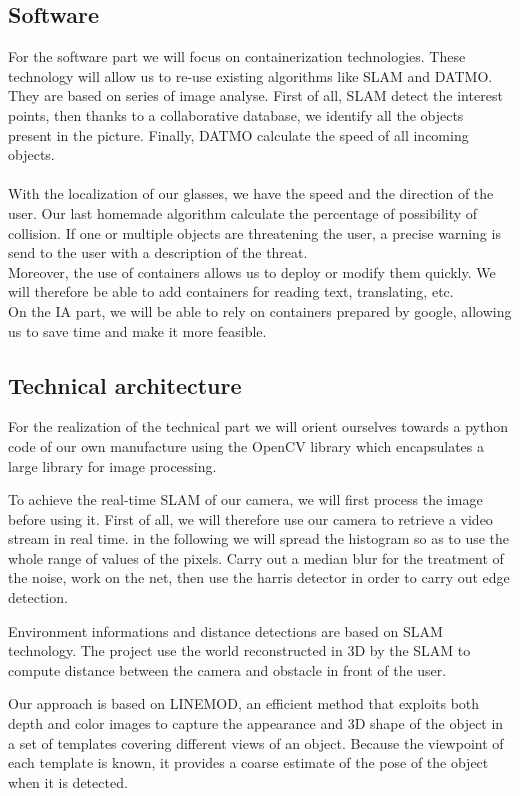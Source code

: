\documentclass[conference,compsoc]{IEEEtran}
\begin{document}
\subsection{Software}
For the software part we will focus on containerization technologies. These technology will allow us to re-use existing algorithms like SLAM and DATMO. They are based on series of image analyse. First of all, SLAM detect the interest points, then thanks to a collaborative database, we identify all the objects present in the picture. Finally, DATMO calculate the speed of all incoming objects.
\\
\\
With the localization of our glasses, we have the speed and the direction of the user. Our last homemade algorithm calculate the percentage of possibility of collision. If one or multiple objects are threatening the user, a precise warning is send to the user with a description of the threat.  
\\
Moreover, the use of containers allows us to deploy or modify them quickly.
We will therefore be able to add containers for reading text, translating, etc.
\\
On the IA part, we will be able to rely on containers prepared by google, allowing us to save time and make it more feasible.

\subsection{Technical architecture}
For the realization of the technical part we will orient ourselves towards a python code of our own manufacture using the OpenCV library which encapsulates a large library for image processing.

To achieve the real-time SLAM of our camera, we will first process the image before using it.
First of all, we will therefore use our camera to retrieve a video stream in real time. in the following we will spread the histogram so as to use the whole range of values of the pixels. Carry out a median blur for the treatment of the noise, work on the net, then use the harris detector in order to carry out edge detection.

Environment informations and distance detections are based on SLAM technology. The project use the world reconstructed in 3D by the SLAM to compute distance between the camera and obstacle in front of the user.

Our approach is based on LINEMOD, an efficient method that exploits both depth and color images to capture the appearance and 3D shape of the object in a set of templates covering different views of an object. Because the viewpoint of each template is known, it provides a coarse estimate of the pose of the object when it is detected.
\end{document}
